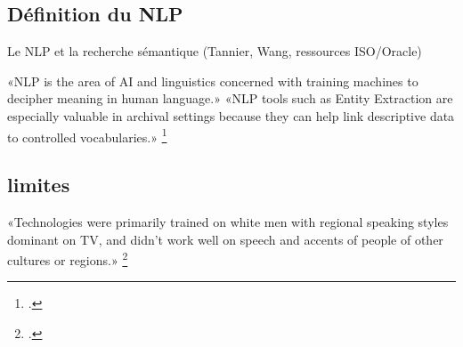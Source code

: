 
	\subsection*{Définition du NLP}
	
	Le NLP et la recherche sémantique (Tannier, Wang, ressources ISO/Oracle)
	
	
«NLP is the area of AI and linguistics concerned with training machines to decipher meaning in human language.»
«NLP tools such as Entity Extraction are especially valuable in archival settings because they can help link descriptive data to controlled vocabularies.»
\footcite{2021}

\subsection*{limites}
«Technologies were primarily trained on white men with regional speaking styles dominant on TV, and didn't work well on speech and accents of people of other cultures or regions.»
\footcite{2021}